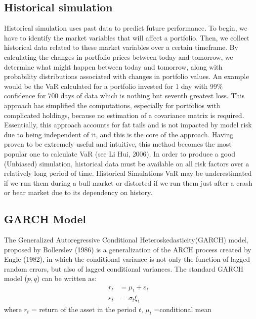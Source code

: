 \documentclass[a4paper,11pt,oneside]{book}
\begin{document}
\subsection{Historical simulation}

Historical simulation uses past data to predict future performance. To begin, we have to identify the market variables that will affect a portfolio. Then, we collect historical data related to these market variables over a certain timeframe. By calculating the changes in portfolio prices between today and tomorrow, we determine what might happen between today and tomorrow, along with probability distributions associated with changes in portfolio values. An example would be the VaR calculated for a portfolio invested for 1 day with 99\% confidence for 700 days of data which is nothing but seventh greatest loss.
\newline\newline This approach has simplified the computations, especially for portfolios with complicated holdings, because no estimation of a covariance matrix is required.\newline\newline
Essentially, this approach accounts for fat tails and is not impacted by model risk due to being independent of it, and this is the core of the approach. Having proven to be extremely useful and intuitive, this method becomes the most popular one to calculate VaR (see Li Hui, 2006). In order to produce a good (Unbiased) simulation, historical data must be available on all risk factors over a relatively long period of time. Historical Simulations VaR may be underestimated if we run them during a bull market or distorted if we run them just after a crash or bear market due to its dependency on history.
\subsection{GARCH Model}
The Generalized Autoregressive Conditional Heteroskedasticity(GARCH) model, proposed by Bollerslev
(1986) is a generalization of the ARCH process created by
Engle (1982), in which the conditional variance is not only
the function of lagged random errors, but also of lagged
conditional variances. The standard GARCH model ($p,q$)
can be written as:
\begin{equation}
\begin{aligned}
r_t &= \mu_t + \varepsilon_t
\\
\varepsilon_t &= \sigma_t \xi_t 
\label{6}
\end{aligned}
\end{equation}
where $r_t$ = return of the asset in the period $t$,\newline
$\mu_t$ =conditional mean \newline
\end{document}

